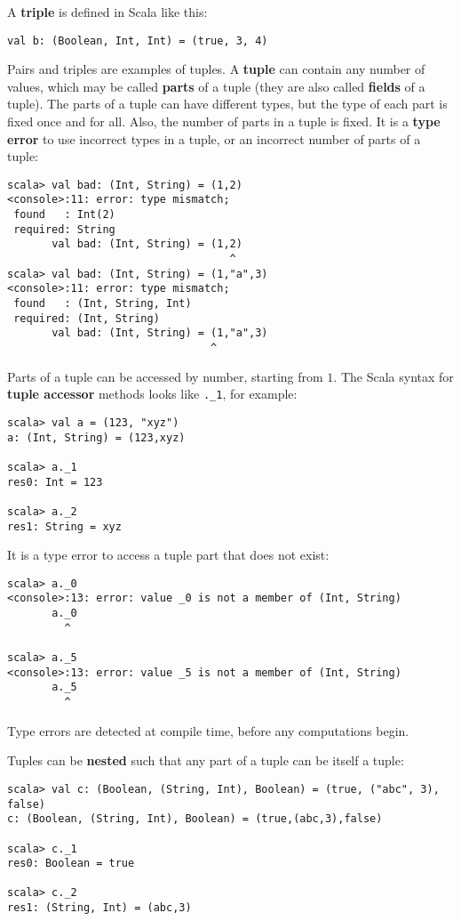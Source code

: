 A \textbf{triple} is defined in Scala like this:
\begin{lstlisting}
val b: (Boolean, Int, Int) = (true, 3, 4)
\end{lstlisting}
Pairs and triples are examples of tuples. A \textbf{tuple} can contain
any number of values, which may be called \textbf{parts}
of a tuple (they are also called \textbf{fields} of
a tuple). The parts of a tuple can have different types, but the type
of each part is fixed once and for all. Also, the number of parts
in a tuple is fixed. It is a \textbf{type error}
to use incorrect types in a tuple, or an incorrect number of parts
of a tuple:
\begin{lstlisting}
scala> val bad: (Int, String) = (1,2)
<console>:11: error: type mismatch;
 found   : Int(2)
 required: String
       val bad: (Int, String) = (1,2)
                                   ^
scala> val bad: (Int, String) = (1,"a",3)
<console>:11: error: type mismatch;
 found   : (Int, String, Int)
 required: (Int, String)
       val bad: (Int, String) = (1,"a",3)
                                ^
\end{lstlisting}
Parts of a tuple can be accessed by number, starting from $1$. The
Scala syntax for \textbf{tuple accessor}
methods looks like \lstinline!._1!, for example:
\begin{lstlisting}
scala> val a = (123, "xyz")
a: (Int, String) = (123,xyz)

scala> a._1
res0: Int = 123

scala> a._2
res1: String = xyz 
\end{lstlisting}
It is a type error to access a tuple part that does not exist:
\begin{lstlisting}
scala> a._0
<console>:13: error: value _0 is not a member of (Int, String)
       a._0
         ^

scala> a._5
<console>:13: error: value _5 is not a member of (Int, String)
       a._5
         ^
\end{lstlisting}
Type errors are detected at compile time, before
any computations begin.

Tuples can be \textbf{nested} such that any
part of a tuple can be itself a tuple:
\begin{lstlisting}
scala> val c: (Boolean, (String, Int), Boolean) = (true, ("abc", 3), false)
c: (Boolean, (String, Int), Boolean) = (true,(abc,3),false)

scala> c._1
res0: Boolean = true

scala> c._2
res1: (String, Int) = (abc,3)
\end{lstlisting}

